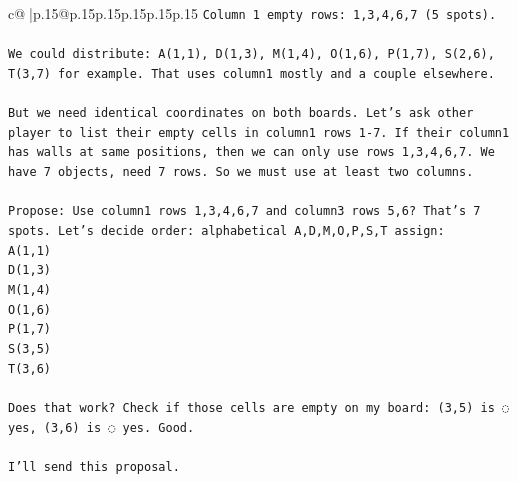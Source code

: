\documentclass{article}
\begin{document}
{\begin{supertabular}{c@{$\;$}|p{.15\linewidth}@{}p{.15\linewidth}p{.15\linewidth}p{.15\linewidth}p{.15\linewidth}p{.15\linewidth}}
{{{\texttt{Column 1 empty rows: 1,3,4,6,7 (5 spots).} \\
\\ 
\texttt{We could distribute: A(1,1), D(1,3), M(1,4), O(1,6), P(1,7), S(2,6), T(3,7) for example. That uses column1 mostly and a couple elsewhere.} \\
\\ 
\texttt{But we need identical coordinates on both boards. Let's ask other player to list their empty cells in column1 rows 1{-}7. If their column1 has walls at same positions, then we can only use rows 1,3,4,6,7. We have 7 objects, need 7 rows. So we must use at least two columns.} \\
\\ 
\texttt{Propose: Use column1 rows 1,3,4,6,7 and column3 rows 5,6? That's 7 spots. Let's decide order: alphabetical A,D,M,O,P,S,T assign:  } \\
\texttt{A(1,1)  } \\
\texttt{D(1,3)  } \\
\texttt{M(1,4)  } \\
\texttt{O(1,6)  } \\
\texttt{P(1,7)  } \\
\texttt{S(3,5)  } \\
\texttt{T(3,6)} \\
\\ 
\texttt{Does that work? Check if those cells are empty on my board: (3,5) is ◌ yes, (3,6) is ◌ yes. Good.} \\
\\ 
\texttt{I'll send this proposal.} \\
            }
        }
    }
     \\ \\


\end{supertabular}}
\end{document}
